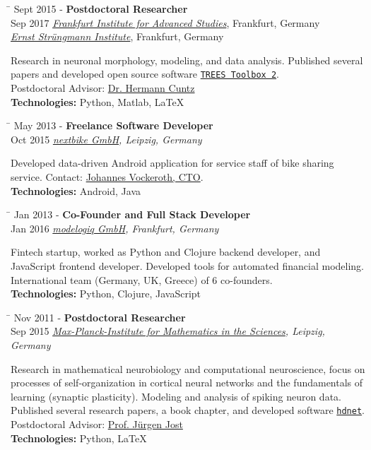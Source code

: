 \documentclass[10pt]{article} %
\newlength{\marginwidth}
\newlength{\smallertextwidth}
\newcommand{\job}[5]{
\begin{tabbing}
\hspace{\marginwidth} \= \kill
{#1} \> \textbf{#3}\\
{#2} \>\+ \textit{#4}\\[5pt]
\begin{minipage}{\smallertextwidth}
\vspace{2mm}
#5
\end{minipage}
\end{tabbing}
\vspace{2mm}
}
\begin{document}
\begin{tabbing}
  \hspace{\marginwidth} \= \kill
  {Sept 2015 -} \> \textbf{Postdoctoral Researcher}\\
  {Sep 2017} \> \textit{\href{https://fias.institute}{Frankfurt Institute for Advanced Studies}}, Frankfurt, Germany\\
  \>\+ \textit{\href{http://www.esi-frankfurt.de}{Ernst Strüngmann Institute}}, Frankfurt, Germany\\[5pt]
  \begin{minipage}{\smallertextwidth}
    \vspace{2mm}
    Research in neuronal morphology, modeling, and data analysis. Published several papers and developed
    open source software \href{https://www.treestoolbox.org/}{\texttt{TREES Toolbox 2}}.\\
    Postdoctoral Advisor: \href{https://www.fias.science/de/neurowissenschaften/gruppen/hermann-cuntz/}{Dr. Hermann Cuntz}\\[5pt]
    \textbf{Technologies:} Python, Matlab, LaTeX  
  \end{minipage}
\end{tabbing}
\vspace{2mm}

\job
{May 2013 -}{Oct 2015}
{Freelance Software Developer}
{\href{https://nextbike.com}{nextbike GmbH}\textup{, Leipzig, Germany}}
{
  Developed data-driven Android application for service staff of bike sharing service.
  Contact: \href{https://www.linkedin.com/in/johannes-vockeroth-8885709a/}{Johannes Vockeroth, CTO}.\\[5pt]
  \textbf{Technologies:} Android, Java
}
  
\job
{Jan 2013 -}{Jan 2016}
{Co-Founder and Full Stack Developer}
{\href{https://www.modelogiq.com}{modelogiq GmbH}\textup{, Frankfurt, Germany}}
{
  Fintech startup, worked as Python and Clojure backend developer, and JavaScript frontend developer.
  Developed tools for automated financial modeling. International team (Germany, UK, Greece) of 6 co-founders.\\[5pt]
  \textbf{Technologies:} Python, Clojure, JavaScript
}

\job
{Nov 2011 -}{Sep 2015}
{Postdoctoral Researcher}
{\href{https://www.mis.mpg.de}{Max-Planck-Institute for Mathematics in the Sciences}\textup{, Leipzig, Germany}}
{
  Research in mathematical neurobiology and computational neuroscience, focus on processes of self-organization
  in cortical neural networks and the fundamentals of learning (synaptic plasticity). Modeling and analysis
  of spiking neuron data. Published several research papers, a book chapter, and developed software
  \texttt{\href{https://github.com/team-hdnet/hdnet}{hdnet}}.\\
  Postdoctoral Advisor: \href{https://www.mis.mpg.de/de/jjost/juergen-jost.html}{Prof. Jürgen Jost}\\[5pt]
  \textbf{Technologies:} Python, LaTeX
}
\end{document}
